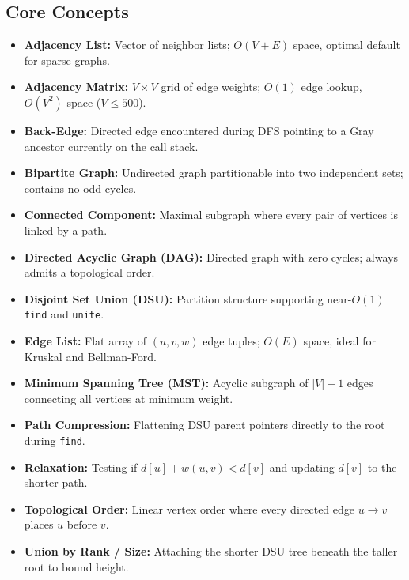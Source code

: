 \documentclass[11pt,a4paper]{article}
\theoremstyle{definition}
\begin{document}
\subsection*{Core Concepts}
\begin{itemize}
    \item \textbf{Adjacency List:} Vector of neighbor lists; $O(V + E)$ space, optimal default for sparse graphs.
    \item \textbf{Adjacency Matrix:} $V \times V$ grid of edge weights; $O(1)$ edge lookup, $O(V^2)$ space ($V \le 500$).
    \item \textbf{Back-Edge:} Directed edge encountered during DFS pointing to a Gray ancestor currently on the call stack.
    \item \textbf{Bipartite Graph:} Undirected graph partitionable into two independent sets; contains no odd cycles.
    \item \textbf{Connected Component:} Maximal subgraph where every pair of vertices is linked by a path.
    \item \textbf{Directed Acyclic Graph (DAG):} Directed graph with zero cycles; always admits a topological order.
    \item \textbf{Disjoint Set Union (DSU):} Partition structure supporting near-$O(1)$ \texttt{find} and \texttt{unite}.
    \item \textbf{Edge List:} Flat array of $(u, v, w)$ edge tuples; $O(E)$ space, ideal for Kruskal and Bellman-Ford.
    \item \textbf{Minimum Spanning Tree (MST):} Acyclic subgraph of $|V| - 1$ edges connecting all vertices at minimum weight.
    \item \textbf{Path Compression:} Flattening DSU parent pointers directly to the root during \texttt{find}.
    \item \textbf{Relaxation:} Testing if $d[u] + w(u, v) < d[v]$ and updating $d[v]$ to the shorter path.
    \item \textbf{Topological Order:} Linear vertex order where every directed edge $u \to v$ places $u$ before $v$.
    \item \textbf{Union by Rank / Size:} Attaching the shorter DSU tree beneath the taller root to bound height.
\end{itemize}
\end{document}

